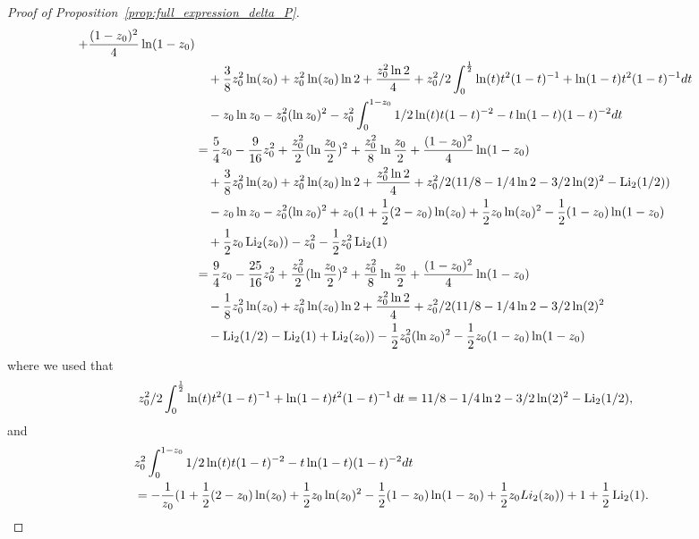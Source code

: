 \begin{proof}[Proof of Proposition~\ref{prop:full_expression_delta_P}]
\begin{align*}
		+\frac{(1-z_0)^2}{4}\ln(1-z_0) \\
	&\hspace{10pt}+\frac{3}{8}z_0^2\ln(z_0)+z_0^2\ln(z_0)\ln 2+\frac{z_0^2 \ln2}{4}
		+z_0^2/2\int_0^{\frac{1}{2}} \ln(t)t^2(1-t)^{-1}+\ln(1-t)t^2(1-t)^{-1}dt \\
	&\hspace{10pt}-z_0 \ln z_0-z_0^2(\ln z_0)^2-z_0^2\int_0^{1-z_0} 1/2\ln(t)t(1-t)^{-2}-t\ln(1-t)(1-t)^{-2}dt \\
	&=\frac{5}{4}z_0-\frac{9}{16}z_0^2 +\frac{z_0^2}{2}(\ln\frac{z_0}{2})^2+\frac{z_0^2}{8}\ln\frac{z_0}{2} 
		+\frac{(1-z_0)^2}{4}\ln(1-z_0) \\
	&\hspace{10pt}+\frac{3}{8}z_0^2\ln(z_0)+z_0^2\ln(z_0)\ln 2+\frac{z_0^2 \ln2}{4}
		+z_0^2/2(11/8 -1/4 \ln 2 -3/2\ln(2)^2 -  \operatorname{Li}_2(1/2)) \\
	&\hspace{10pt}-z_0 \ln z_0-z_0^2(\ln z_0)^2+z_0(1 + \frac{1}{2}(2-z_0) \ln(z_0) 
		+ \frac{1}{2}z_0 \ln(z_0)^2 - \frac{1}{2} (1-z_0) \ln(1-z_0) \\
	&\hspace{10pt}+\frac{1}{2}z_0 \operatorname{Li}_2(z_0)) - z_0^2   -\frac{1}{2}  z_0^2\operatorname{Li}_2(1) \\
	&=\frac{9}{4}z_0-\frac{25}{16}z_0^2 +\frac{z_0^2}{2}(\ln\frac{z_0}{2})^2+\frac{z_0^2}{8}\ln\frac{z_0}{2} 
		+\frac{(1-z_0)^2}{4}\ln(1-z_0) \\
	&\hspace{10pt}-\frac{1}{8}z_0^2\ln(z_0)+z_0^2\ln(z_0)\ln 2+\frac{z_0^2 \ln2}{4}
		+z_0^2/2(11/8 -1/4 \ln 2 -3/2\ln(2)^2 \\
	&\hspace{10pt}- \operatorname{Li}_2(1/2)-\operatorname{Li}_2(1)+\operatorname{Li}_2(z_0)) -\frac{1}{2}z_0^2(\ln z_0)^2 - \frac{1}{2} z_0(1-z_0) \ln(1-z_0)
\end{align*}
where we used that
\begin{align*}
	z_0^2/2\int_0^{\frac{1}{2}} \ln(t)t^2(1-t)^{-1}+\ln(1-t)t^2(1-t)^{-1} \operatorname{\mathrm{d}\hspace{-2pt}} t
	&= 11/8 -1/4 \ln 2 -3/2\ln(2)^2 -  \operatorname{Li}_2(1/2),
\end{align*}
and
\begin{align*}
	&z_0^2\int_0^{1-z_0} 1/2\ln(t)t(1-t)^{-2}-t\ln(1-t)(1-t)^{-2}dt\\
	&= -\frac{1}{z_0} (1 + \frac{1}{2}(2-z_0) \ln(z_0) + \frac{1}{2}z_0 \ln(z_0)^2 - \frac{1}{2} (1-z_0) \ln(1-z_0) +\frac{1}{2}z_0 Li_2(z_0))+1   +\frac{1}{2}  \operatorname{Li}_2(1).
\end{align*}

\end{proof}
